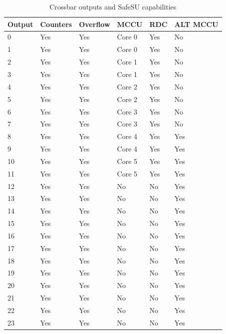 \begin{table}
	\caption{Crossbar outputs and SafeSU capabilities}
	\label{tab:features}
\begin{small}
	\begin{center}
		\begin{tabular}{|l|l|l|l|l|l|}
			\hline
			\textbf{Output} & \textbf{Counters} & \textbf{Overflow}  & \textbf{MCCU}  & \textbf{RDC} & \textbf{ALT MCCU}\\
			\hline
			0 & Yes & Yes & Core 0 & Yes & No \\
			\hline
			1 & Yes & Yes & Core 0 & Yes & No \\
			\hline
			2 & Yes & Yes & Core 1 & Yes & No \\
			\hline
			3 & Yes & Yes & Core 1 & Yes & No \\
			\hline
			4 & Yes & Yes & Core 2 & Yes & No \\
			\hline
			5 & Yes & Yes & Core 2 & Yes & No \\
			\hline
			6 & Yes & Yes & Core 3 & Yes & No \\
			\hline
			7 & Yes & Yes & Core 3 & Yes & No \\
			\hline
			8 & Yes & Yes & Core 4 & Yes & Yes \\
			\hline
			9 & Yes & Yes & Core 4 & Yes & Yes \\
			\hline
			10 & Yes & Yes & Core 5 & Yes & Yes \\
			\hline
			11 & Yes & Yes & Core 5 & Yes & Yes \\
			\hline
			12 & Yes & Yes & No & No & Yes \\
			\hline
			13 & Yes & Yes & No & No & Yes \\
			\hline
			14 & Yes & Yes & No & No & Yes \\
			\hline
			15 & Yes & Yes & No & No & Yes \\
			\hline
			16 & Yes & Yes & No & No & Yes \\
			\hline
			17 & Yes & Yes & No & No & Yes \\
			\hline
			18 & Yes & Yes & No & No & Yes \\
			\hline
			19 & Yes & Yes & No & No & Yes \\
			\hline
			20 & Yes & Yes & No & No & Yes \\
			\hline
			21 & Yes & Yes & No & No & Yes \\
			\hline
			22 & Yes & Yes & No & No & Yes \\
			\hline
			23 & Yes & Yes & No & No & Yes \\
			\hline
		\end{tabular}
	\end{center}
\end{small}
\end{table}

